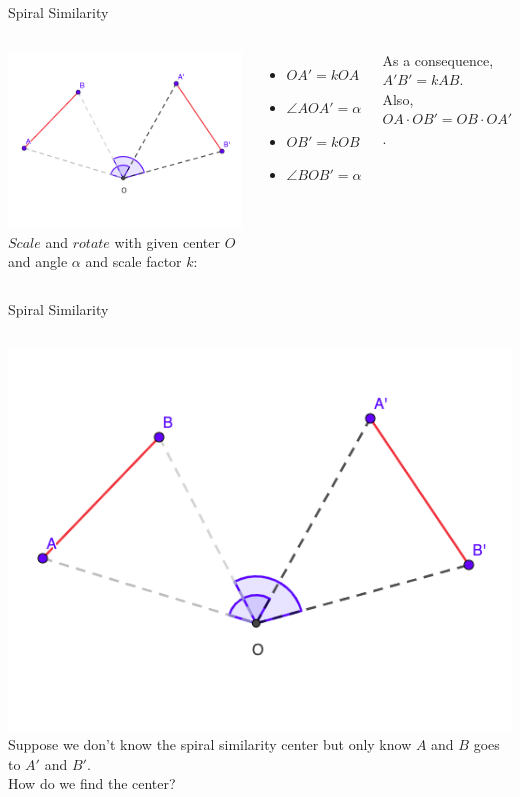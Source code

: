 \documentclass{beamer}
\begin{document}
\begin{frame}{Spiral Similarity}
	\begin{columns}
		\includegraphics[scale=0.4]{spi1.png}
		$Scale$ and $rotate$ with given center $O$ and angle
		$\alpha$ and scale factor $k$:
		\begin{itemize}
			\item $OA' = kOA$
			\item $\angle AOA' = \alpha$
			\item $OB' = kOB$
			\item $\angle BOB' = \alpha$
		\end{itemize}
		As a consequence, $A'B' = kAB$.\\
		Also, $OA\cdot OB' = OB\cdot OA'$.
	\end{columns}
\end{frame}
\begin{frame}{Spiral Similarity}
	\begin{columns}
		\column{0.6\textwidth}
		\includegraphics[scale=0.37]{spi1.png}
		\column{0.4\textwidth}
		Suppose we don't know the spiral similarity center 
		but only know $A$ and $B$ goes to $A'$ and $B'$.\\
		\phantom{Spacing}
		How do we find the center?
	\end{columns}
\end{frame}
\end{document}
